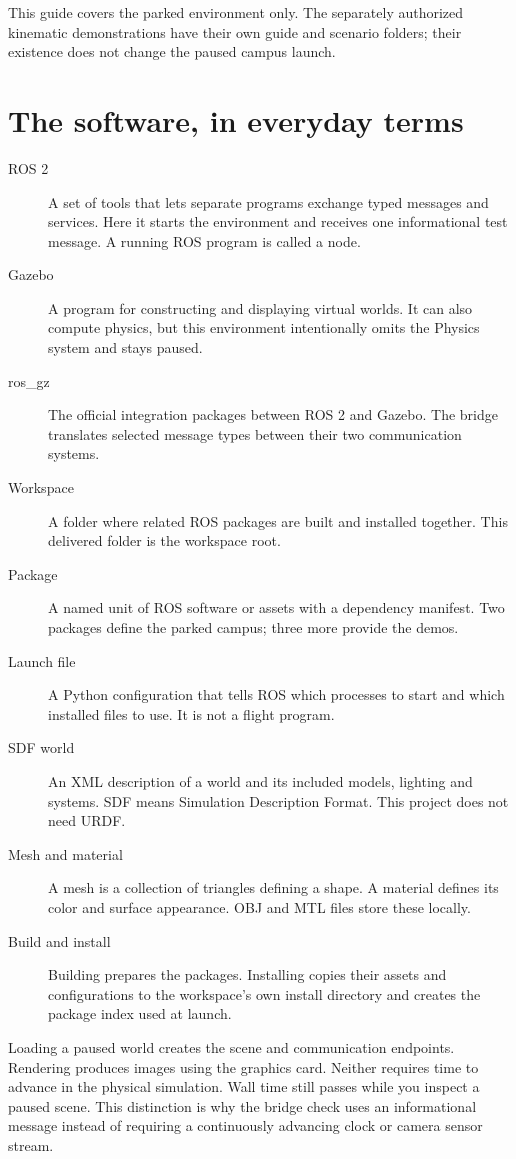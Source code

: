 This guide covers the parked environment only. The separately authorized kinematic demonstrations have their own guide and scenario folders; their existence does not change the paused campus launch.

\section{The software, in everyday terms}
\begin{description}
\item[ROS 2] A set of tools that lets separate programs exchange typed messages and services. Here it starts the environment and receives one informational test message. A running ROS program is called a node.
\item[Gazebo] A program for constructing and displaying virtual worlds. It can also compute physics, but this environment intentionally omits the Physics system and stays paused.
\item[ros\_gz] The official integration packages between ROS 2 and Gazebo. The bridge translates selected message types between their two communication systems.
\item[Workspace] A folder where related ROS packages are built and installed together. This delivered folder is the workspace root.
\item[Package] A named unit of ROS software or assets with a dependency manifest. Two packages define the parked campus; three more provide the demos.
\item[Launch file] A Python configuration that tells ROS which processes to start and which installed files to use. It is not a flight program.
\item[SDF world] An XML description of a world and its included models, lighting and systems. SDF means Simulation Description Format. This project does not need URDF.
\item[Mesh and material] A mesh is a collection of triangles defining a shape. A material defines its color and surface appearance. OBJ and MTL files store these locally.
\item[Build and install] Building prepares the packages. Installing copies their assets and configurations to the workspace's own install directory and creates the package index used at launch.
\end{description}

Loading a paused world creates the scene and communication endpoints. Rendering produces images using the graphics card. Neither requires time to advance in the physical simulation. Wall time still passes while you inspect a paused scene. This distinction is why the bridge check uses an informational message instead of requiring a continuously advancing clock or camera sensor stream.

